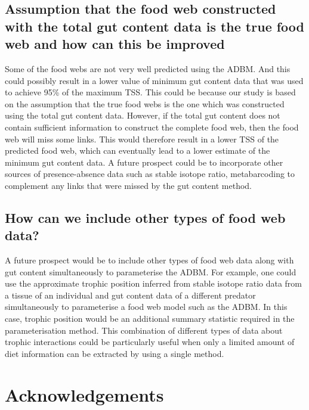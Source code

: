 \documentclass{article}
\begin{document}
\hypertarget{assumption-that-the-food-web-constructed-with-the-total-gut-content-data-is-the-true-food-web-and-how-can-this-be-improved}{%
\subsection{Assumption that the food web constructed with the total gut
content data is the true food web and how can this be
improved}\label{assumption-that-the-food-web-constructed-with-the-total-gut-content-data-is-the-true-food-web-and-how-can-this-be-improved}}

Some of the food webs are not very well predicted using the ADBM. And
this could possibly result in a lower value of minimum gut content data
that was used to achieve 95\% of the maximum TSS. This could be because
our study is based on the assumption that the true food webs is the one
which was constructed using the total gut content data. However, if the
total gut content does not contain sufficient information to construct
the complete food web, then the food web will miss some links. This
would therefore result in a lower TSS of the predicted food web, which
can eventually lead to a lower estimate of the minimum gut content data.
A future prospect could be to incorporate other sources of
presence-absence data such as stable isotope ratio, metabarcoding to
complement any links that were missed by the gut content method.

\hypertarget{how-can-we-include-other-types-of-food-web-data}{%
\subsection{How can we include other types of food web
data?}\label{how-can-we-include-other-types-of-food-web-data}}

A future prospect would be to include other types of food web data along
with gut content simultaneously to parameterise the ADBM. For example,
one could use the approximate trophic position inferred from stable
isotope ratio data from a tissue of an individual and gut content data
of a different predator simultaneously to parameterise a food web model
such as the ADBM. In this case, trophic position would be an additional
summary statistic required in the parameterisation method. This
combination of different types of data about trophic interactions could
be particularly useful when only a limited amount of diet information
can be extracted by using a single method.

\hypertarget{acknowledgements}{%
\section{Acknowledgements}\label{acknowledgements}}
\end{document}
